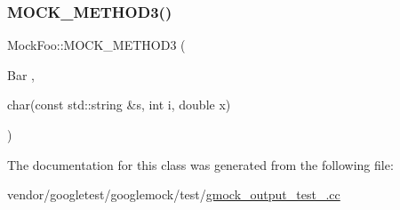\mbox{\label{class_mock_foo_a8f323a65afd93c0605a02b278b101d18}} 
\subsubsection{\texorpdfstring{M\+O\+C\+K\+\_\+\+M\+E\+T\+H\+O\+D3()}{MOCK\_METHOD3()}}
{\footnotesize\ttfamily Mock\+Foo\+::\+M\+O\+C\+K\+\_\+\+M\+E\+T\+H\+O\+D3 (\begin{DoxyParamCaption}\item[{Bar}]{,  }\item[{char(const std\+::string \&s, int i, double x)}]{ }\end{DoxyParamCaption})}



The documentation for this class was generated from the following file\+:\begin{DoxyCompactItemize}
\item 
vendor/googletest/googlemock/test/\hyperlink{gmock__output__test___8cc}{gmock\+\_\+output\+\_\+test\+\_\+.\+cc}\end{DoxyCompactItemize}

